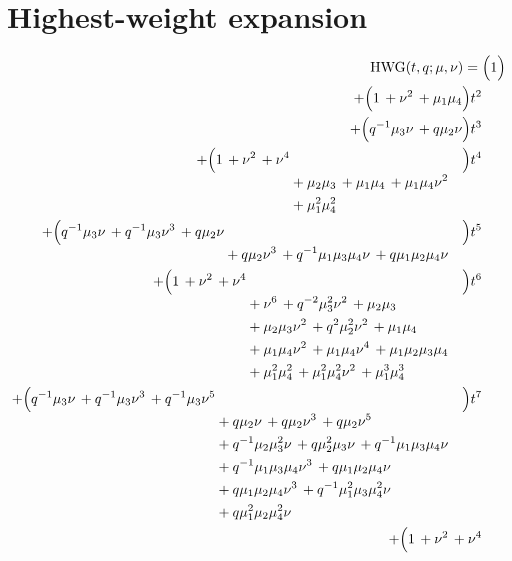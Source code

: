 \documentclass[10pt]{article}
\begin{document}
\section{Highest-weight expansion}
\[
\begin{aligned}
\mathrm{HWG}(t,q;\mu,\nu) ={}&
   \Bigl(1\Bigr) \\
  + \Bigl(1\,+\nu^{2}\,+\mu_1\mu_4\Bigr)t^{2} \\
  + \Bigl(q^{-1}\mu_3\nu\,+q\mu_2\nu\Bigr)t^{3} \\
  + \Bigl(\begin{aligned}[t]1\,+\nu^{2}\,+\nu^{4} \\
  &{}+\mu_2\mu_3\,+\mu_1\mu_4\,+\mu_1\mu_4\nu^{2} \\
  &{}+\mu_1^{2}\mu_4^{2}\end{aligned}\Bigr)t^{4} \\
  + \Bigl(\begin{aligned}[t]q^{-1}\mu_3\nu\,+q^{-1}\mu_3\nu^{3}\,+q\mu_2\nu \\
  &{}+q\mu_2\nu^{3}\,+q^{-1}\mu_1\mu_3\mu_4\nu\,+q\mu_1\mu_2\mu_4\nu\end{aligned}\Bigr)t^{5} \\
  + \Bigl(\begin{aligned}[t]1\,+\nu^{2}\,+\nu^{4} \\
  &{}+\nu^{6}\,+q^{-2}\mu_3^{2}\nu^{2}\,+\mu_2\mu_3 \\
  &{}+\mu_2\mu_3\nu^{2}\,+q^{2}\mu_2^{2}\nu^{2}\,+\mu_1\mu_4 \\
  &{}+\mu_1\mu_4\nu^{2}\,+\mu_1\mu_4\nu^{4}\,+\mu_1\mu_2\mu_3\mu_4 \\
  &{}+\mu_1^{2}\mu_4^{2}\,+\mu_1^{2}\mu_4^{2}\nu^{2}\,+\mu_1^{3}\mu_4^{3}\end{aligned}\Bigr)t^{6} \\
  + \Bigl(\begin{aligned}[t]q^{-1}\mu_3\nu\,+q^{-1}\mu_3\nu^{3}\,+q^{-1}\mu_3\nu^{5} \\
  &{}+q\mu_2\nu\,+q\mu_2\nu^{3}\,+q\mu_2\nu^{5} \\
  &{}+q^{-1}\mu_2\mu_3^{2}\nu\,+q\mu_2^{2}\mu_3\nu\,+q^{-1}\mu_1\mu_3\mu_4\nu \\
  &{}+q^{-1}\mu_1\mu_3\mu_4\nu^{3}\,+q\mu_1\mu_2\mu_4\nu \\
  &{}+q\mu_1\mu_2\mu_4\nu^{3}\,+q^{-1}\mu_1^{2}\mu_3\mu_4^{2}\nu \\
  &{}+q\mu_1^{2}\mu_2\mu_4^{2}\nu\end{aligned}\Bigr)t^{7} \\
  + \Bigl(\begin{aligned}[t]1\,+\nu^{2}\,+\nu^{4} \\

\end{aligned}
\end{aligned}\]
\end{document}

